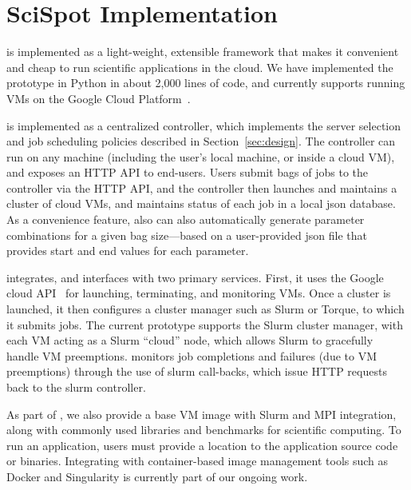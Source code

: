 \section{SciSpot Implementation}

\sysname is implemented as a light-weight, extensible framework that makes it convenient and cheap to run scientific applications in the cloud.
We have implemented the \sysname prototype in Python in about 2,000 lines of code, and currently supports running VMs on the Google Cloud Platform~\cite{gcp}. 

\sysname is implemented as a centralized controller, which implements the server selection and job scheduling policies described in Section~\ref{sec:design}. 
The controller can run on any machine (including the user's local machine, or inside a cloud VM), and exposes an HTTP API to end-users. 
Users submit bags of jobs to the controller via the HTTP API, and the controller then launches and maintains a cluster of cloud VMs, and maintains status of each job in a local json database.
As a convenience feature, \sysname also can also automatically generate parameter combinations for a given bag size---based on a user-provided json file that provides start and end values for each parameter. 



\sysname integrates, and interfaces with two primary services.
First, it uses the Google cloud API~\cite{gcloud-api} for launching, terminating, and monitoring VMs.
Once a cluster is launched, it then configures a cluster manager such as Slurm or Torque, to which it submits jobs. 
The current \sysname prototype supports the Slurm cluster manager, with each VM acting as a Slurm ``cloud'' node, which allows Slurm to gracefully handle VM preemptions. 
\sysname monitors job completions and failures (due to VM preemptions) through the use of slurm call-backs, which issue HTTP requests back to the slurm controller.

As part of \sysname, we also provide a base VM image with Slurm and MPI integration, along with commonly used libraries and benchmarks for scientific computing. To run an application, users must provide a location to the application source code or binaries. Integrating \sysname with container-based image management tools such as Docker and Singularity is currently part of our ongoing work. 





